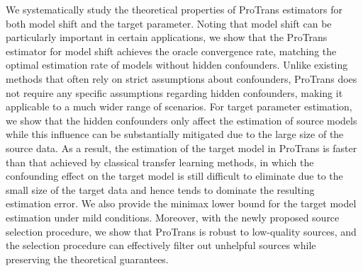 \documentclass[12pt]{article}
\begin{document}

We systematically study the theoretical properties of ProTrans estimators for both model shift and the target parameter. Noting that model shift can be particularly important in certain applications, we show that the ProTrans estimator for model shift achieves the oracle convergence rate, matching the optimal estimation rate of models without hidden confounders. Unlike existing methods that often rely on strict assumptions about confounders, ProTrans does not require any specific assumptions regarding hidden confounders, making it applicable to a much wider range of scenarios. For target parameter estimation, we show that the hidden confounders only affect the estimation of source models while this influence can be substantially mitigated due to the large size of the source data.
As a result, the estimation of the target model in ProTrans is faster than that achieved by classical transfer learning methods, in which the confounding effect on the target model is still difficult to eliminate due to the small size of the target data and hence tends to dominate the resulting estimation error. We also provide the minimax lower bound for the target model estimation under mild conditions. Moreover, with the newly proposed source selection procedure, we show that ProTrans is robust to low-quality sources, and the selection procedure can effectively filter out unhelpful sources while preserving the theoretical guarantees. 
\end{document}

